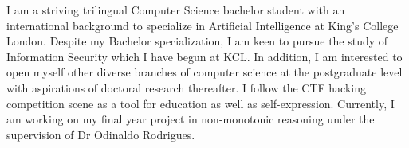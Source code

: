 

\begin{cvparagraph}

I am a striving trilingual Computer Science bachelor student with an international background to specialize in Artificial Intelligence at King’s College London. Despite my Bachelor specialization, I am keen to pursue the study of Information Security which I have begun at KCL. In addition, I am interested to open myself other diverse branches of computer science at the postgraduate level with aspirations of doctoral research thereafter. I follow the CTF hacking competition scene as a tool for education as well as self-expression. Currently, I am working on my final year project in non-monotonic reasoning under the supervision of Dr Odinaldo Rodrigues.
\end{cvparagraph}
